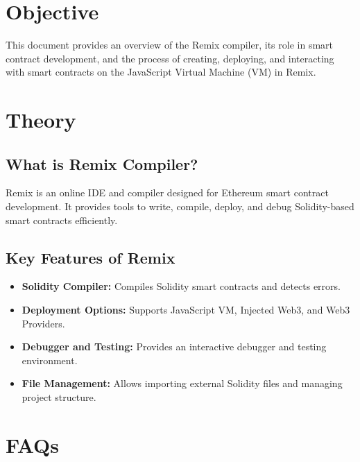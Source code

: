 \documentclass[11pt]{article}
\begin{document}
\tableofcontents
\thispagestyle{empty}
\clearpage


\section{Objective}
This document provides an overview of the Remix compiler, its role in smart contract development, and the process of creating, deploying, and interacting with smart contracts on the JavaScript Virtual Machine (VM) in Remix.

\section{Theory}

\subsection{What is Remix Compiler?}
Remix is an online IDE and compiler designed for Ethereum smart contract development. It provides tools to write, compile, deploy, and debug Solidity-based smart contracts efficiently.

\subsection{Key Features of Remix}
\begin{itemize}
    \item \textbf{Solidity Compiler:} Compiles Solidity smart contracts and detects errors.
    \item \textbf{Deployment Options:} Supports JavaScript VM, Injected Web3, and Web3 Providers.
    \item \textbf{Debugger and Testing:} Provides an interactive debugger and testing environment.
    \item \textbf{File Management:} Allows importing external Solidity files and managing project structure.
\end{itemize}

\section{FAQs}
\end{document}
